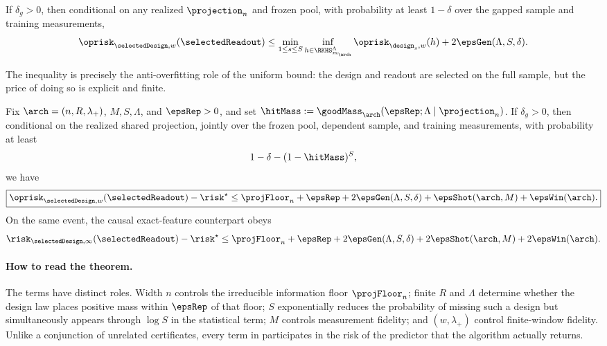 \begin{theorem}
\label{thm:finite-pool-erm-oracle}
If $\delta_g>0$, then conditional on any realized $\projection_n$ and frozen
pool, with probability at least $1-\delta$ over the gapped sample and training
measurements,
\begin{equation}
    \oprisk_{\selectedDesign,w}(\selectedReadout)
    \leq
    \min_{1\leq s\leq S}
      \inf_{h\in\RKHS_{m_{\arch}}^\Lambda}
      \oprisk_{\design_s,w}(h)
    +2\epsGen(\Lambda,S,\delta).
    \label{eq:finite-pool-operational-oracle}
\end{equation}
\end{theorem}

The inequality is precisely the anti-overfitting role of the uniform bound:
the design and readout are selected on the full sample, but the price of doing
so is explicit and finite.

\begin{theorem}
\label{thm:resource-performance}
Fix $\arch=(n,R,\lambda_+)$, $M,S,\Lambda$, and $\epsRep>0$, and set
$\hitMass:=\goodMass_{\arch}(\epsRep;\Lambda\mid\projection_n)$.
If $\delta_g>0$, then conditional on the realized shared projection, jointly
over the frozen pool, dependent sample, and training measurements, with
probability at least
\begin{equation}
    1-\delta-(1-\hitMass)^S,
    \label{eq:resource-performance-confidence}
\end{equation}
we have
\begin{equation}
\boxed{
    \oprisk_{\selectedDesign,w}(\selectedReadout)-\risk^\star
    \leq
    \projFloor_n+\epsRep
    +2\epsGen(\Lambda,S,\delta)
    +\epsShot(\arch,M)
    +\epsWin(\arch).
}
    \label{eq:resource-performance-bound}
\end{equation}
On the same event, the causal exact-feature counterpart obeys
\begin{equation}
    \risk_{\selectedDesign,\infty}(\selectedReadout)-\risk^\star
    \leq
    \projFloor_n+\epsRep
    +2\epsGen(\Lambda,S,\delta)
    +2\epsShot(\arch,M)
    +2\epsWin(\arch).
    \label{eq:resource-performance-causal}
\end{equation}
\end{theorem}

\paragraph{How to read the theorem.}
The terms have distinct roles.  Width $n$ controls the irreducible information
floor $\projFloor_n$; finite $R$ and $\Lambda$ determine whether the design law
places positive mass within $\epsRep$ of that floor; $S$ exponentially reduces
the probability of missing such a design but simultaneously appears through
$\log S$ in the statistical term; $M$ controls measurement fidelity; and
$(w,\lambda_+)$ control finite-window fidelity.  Unlike a conjunction of
unrelated certificates, every term in 
participates in the risk of the predictor that the algorithm actually returns.

